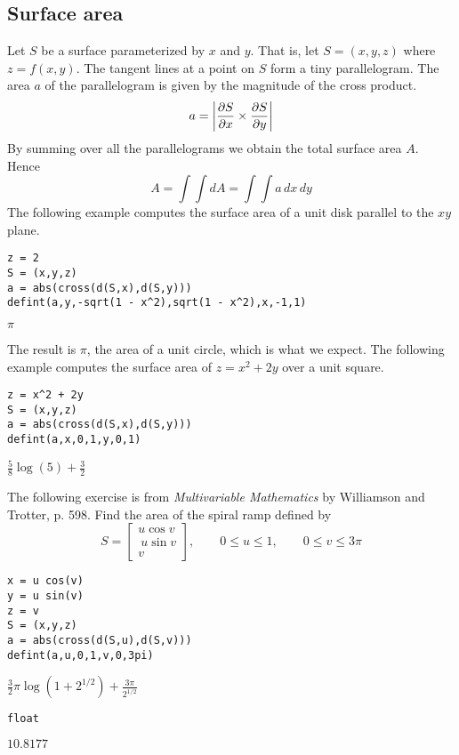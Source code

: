
\subsection{Surface area}
Let $S$ be a surface parameterized by $x$ and $y$.
That is, let $S=(x,y,z)$ where $z=f(x,y)$.
The tangent lines at a point on $S$ form a tiny parallelogram.
The area $a$ of the parallelogram is given by the magnitude of the cross product.
$$a=\left|{\partial S\over\partial x}\times{\partial S\over\partial y}\right|$$
By summing over all the parallelograms we obtain the total surface area $A$.
Hence
$$A=\int\!\!\!\int dA=\int\!\!\!\int a\,dx\,dy$$
The following example computes the surface area of a unit disk
parallel to the $xy$ plane.

\begin{Verbatim}[formatcom=\color{blue},samepage=true]
z = 2
S = (x,y,z)
a = abs(cross(d(S,x),d(S,y)))
defint(a,y,-sqrt(1 - x^2),sqrt(1 - x^2),x,-1,1)
\end{Verbatim}

\noindent
$\displaystyle \pi$

\bigskip
\noindent
The result is $\pi$, the area of a unit circle, which is what we expect.
The following example computes the surface area of $z=x^2+2y$ over
a unit square.

\begin{Verbatim}[formatcom=\color{blue},samepage=true]
z = x^2 + 2y
S = (x,y,z)
a = abs(cross(d(S,x),d(S,y)))
defint(a,x,0,1,y,0,1)
\end{Verbatim}

\noindent
$\displaystyle \tfrac{5}{8}\log(5)+\tfrac{3}{2}$

\bigskip
\noindent
The following exercise is from
{\it Multivariable Mathematics} by Williamson and Trotter, p. 598.
Find the area of the spiral ramp defined by
$$S=\begin{bmatrix}u\cos v\\\ u\sin v\\ v\end{bmatrix},\qquad 0\le u\le1,\qquad 0\le v\le3\pi$$

\begin{Verbatim}[formatcom=\color{blue},samepage=true]
x = u cos(v)
y = u sin(v)
z = v
S = (x,y,z)
a = abs(cross(d(S,u),d(S,v)))
defint(a,u,0,1,v,0,3pi)
\end{Verbatim}

\noindent
$\displaystyle \tfrac{3}{2}\pi\log(1+2^{1/2})+\frac{3\pi}{2^{1/2}}$

\begin{Verbatim}[formatcom=\color{blue},samepage=true]
float
\end{Verbatim}

\noindent
$\displaystyle 10.8177$
